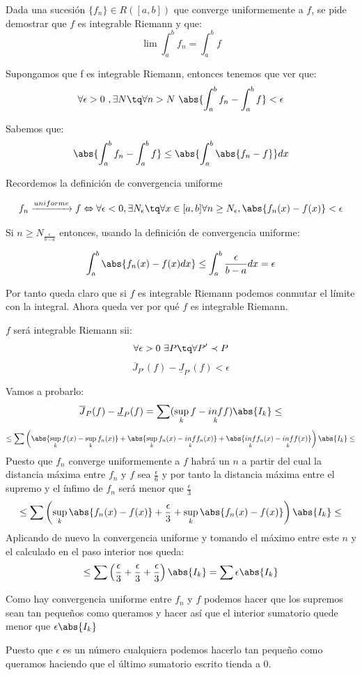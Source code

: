 \begin{problem}[5]
Dada una sucesión $\lbrace f_n \rbrace \in R([a,b])$ que converge uniformemente a $f$, se pide demostrar que $f$ es integrable Riemann y que:
\[ \lim \int_{a}^{b} f_n = \int_{a}^{b} f \]

\solution
Supongamos que f es integrable Riemann, entonces tenemos que ver que:
\[ \forall \epsilon > 0 \ , \exists N \tq \forall n> N \ \abs{\int_a^b f_n - \int_a^b f} < \epsilon\]

Sabemos que:
\[\abs{\int_a^b f_n - \int_a^b f} \leq \abs{\int_a^b \abs{f_n -f}} dx\]

Recordemos la definición de convergencia uniforme

\begin{defn}
\[f_n \xrightarrow{uniforme} f \Leftrightarrow \forall \epsilon < 0, \exists N_{\epsilon} \tq \forall x \in [a,b]  \forall n \geq N_{\epsilon}, \abs{f_n (x) - f(x)} < \epsilon\]
\end{defn}

Si $n \geq N_{\frac{\epsilon}{b-a}}$ entonces, usando la definición de convergencia uniforme:

\[\int_a^b \abs{f_n(x) - f(x) dx} \leq \int_a^b \frac{\epsilon}{b-a}dx = \epsilon\]

Por tanto queda claro que si $f$ es integrable Riemann podemos conmutar el límite con la integral. Ahora queda ver por qué $f$ es integrable Riemann.

$f$ será integrable Riemann sii:
\[\forall \epsilon > 0 \ \exists P \tq \forall P' \prec P \]
\[\overline{J}_{P'}(f) - \underline{J}_{P'}(f) < \epsilon\]

Vamos a probarlo:
\[\overline{J}_P(f) - \underline{J}_P(f) = \sum(\sup_k f - \underset{k}{inf} f)\abs{I_k} \leq\]
\[\leq \sum\left( \abs{\sup_{k}f(x) - \sup_{k}f_n(x)} + \abs{\sup_{k}f_n(x) - \underset{k}{inf}f_n(x)} +  \abs{\underset{k}{inf}f_n(x) - \underset{k}{inf}f(x)} \right)\abs{I_k} \leq \]
Puesto que $f_n$ converge uniformemente a $f$ habrá un $n$ a partir del cual la distancia máxima entre $f_n$ y $f$ sea $\frac{\epsilon}{6}$ y por tanto la distancia máxima entre el supremo y el ínfimo de $f_n$ será menor que $\frac{\epsilon}{3}$
\[\leq \sum\left( \sup_{k} \abs{f_n(x) - f(x)} + \frac{\epsilon}{3} + \sup_k \abs{f_n(x) - f(x)} \right)\abs{I_k} \leq\]
Aplicando de nuevo la convergencia uniforme y tomando el máximo entre este $n$ y el calculado en el paso interior nos queda:
\[\leq \sum \left(\frac{\epsilon}{3} + \frac{\epsilon}{3} + \frac{\epsilon}{3} \right)\abs{I_k} = \sum\epsilon\abs{I_k}\]

Como hay convergencia uniforme entre $f_n$ y $f$ podemos hacer que los supremos sean tan pequeños como queramos y hacer así que el interior sumatorio quede menor que $\epsilon \abs{I_k}$

Puesto que $\epsilon$ es un número cualquiera podemos hacerlo tan pequeño como queramos haciendo que el último sumatorio escrito tienda a 0.

\end{problem}

